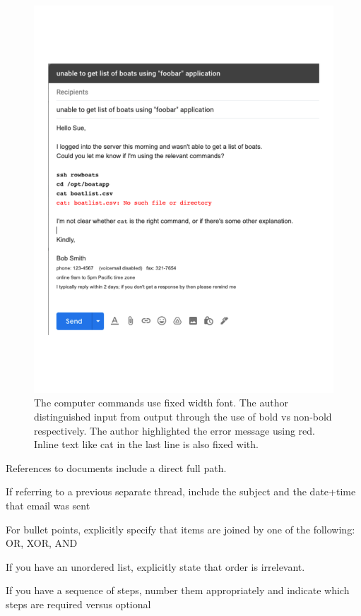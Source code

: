 \begin{figure}
\includegraphics[width=1\textwidth]{images/email_computer_font.pdf}
\caption{The computer commands use fixed width font. The author distinguished input from output through the use of bold vs non-bold respectively. The author highlighted the error message using red. Inline text like cat in the last line is also fixed with.}
\label{fig:email_computer_font}
\end{figure}

References to documents include a direct full path.

If referring to a previous separate thread, include the subject and the date+time that email was sent

For bullet points, explicitly specify that items are joined by one of the following: OR, XOR, AND

If you have an unordered list, explicitly state that order is irrelevant.

If you have a sequence of steps, number them appropriately and indicate which steps are required versus optional

